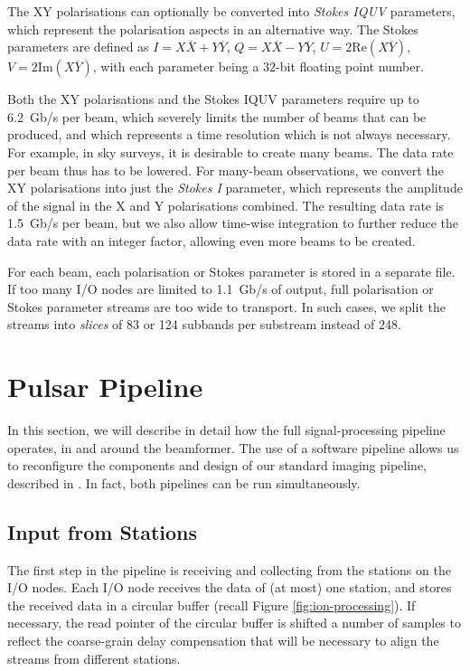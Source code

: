 \documentclass{llncs}
\begin{document}
The XY polarisations can optionally be converted into \emph{Stokes IQUV} parameters, which represent the polarisation aspects in an alternative way. The Stokes parameters are defined as $I = X\overline{X} + Y\overline{Y}$, $Q = X\overline{X} - Y\overline{Y}$, $U = 2\mathrm{Re}(X\overline{Y})$, $V = 2\mathrm{Im}(X\overline{Y})$, with each parameter being a 32-bit floating point number. 

Both the XY polarisations and the Stokes IQUV parameters require up to 6.2~Gb/s per beam, which severely limits the number of beams that can be produced, and which represents a time resolution which is not always necessary. For example, in sky surveys, it is desirable to create many beams. The data rate per beam thus has to be lowered. For many-beam observations, we convert the XY polarisations into just the \emph{Stokes I} parameter, which represents the amplitude of the signal in the X and Y polarisations combined. The resulting data rate is 1.5~Gb/s per beam, but we also allow time-wise integration to further reduce the data rate with an integer factor, allowing even more beams to be created.

For each beam, each polarisation or Stokes parameter is stored in a separate file. If too many I/O nodes are limited to 1.1~Gb/s of output, full polarisation or Stokes parameter streams are too wide to transport. In such cases, we split the streams into \emph{slices} of 83 or 124 subbands per substream instead of 248.

\section{Pulsar Pipeline}


In this section, we will describe in detail how the full signal-processing pipeline operates, in and around the beamformer. The use of a software pipeline allows us to reconfigure the components and design of our standard imaging pipeline, described in \cite{Romein:10a}. In fact, both pipelines can be run simultaneously.

\subsection{Input from Stations}
The first step in the pipeline is receiving and collecting from the stations on the I/O nodes. Each I/O node receives the data of (at most) one station, and stores the received data in a circular buffer (recall Figure \ref{fig:ion-processing}). If necessary, the read pointer of the circular buffer is shifted a number of samples to reflect the coarse-grain delay compensation that will be necessary to align the streams from different stations.
\end{document}
